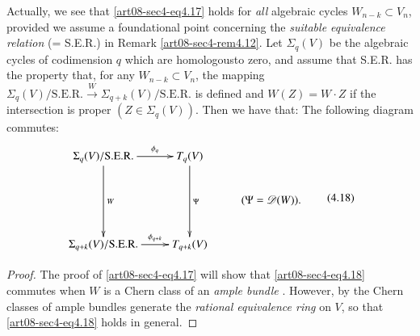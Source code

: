 \begin{remark*}
Actually, we see that \eqref{art08-sec4-eq4.17} holds for {\em all} algebraic cycles $W_{n-k}\subset V_{n}$, provided we assume a foundational point concerning the {\em suitable equivalence relation} (= S.E.R.) in Remark \ref{art08-sec4-rem4.12}. Let $\Sigma_{q}(V)$ be the algebraic cycles of codimension $q$ which are homologous\pageoriginale to zero, and assume that S.E.R. has the property that, for any $W_{n-k}\subset V_{n}$, the mapping $\Sigma_{q}(V)/\text{S.E.R.}\xrightarrow{W}\Sigma_{q+k}(V)/\text{S.E.R.}$ is defined and $W(Z)=W\cdot Z$ if the intersection is proper $(Z\in \Sigma_{q}(V))$. Then we have that: The following diagram commutes:
\begin{equation*}
\vcenter{\xymatrix{
\Sigma_{q}(V)/\text{S.E.R.}\ar[dd]^-{W}\ar[r]^-{\phi_{q}} & T_{q}(V)\ar[dd]^-{\Psi} &\\
 & & (\Psi=\mathscr{D}(W)).\\
\Sigma_{q+k}(V)/\text{S.E.R.}\ar[r]^-{\phi_{q+k}} & T_{q+k}(V) &
}}\tag{4.18}\label{art08-sec4-eq4.18}
\end{equation*}
\end{remark*}

\begin{proof}
The proof of \eqref{art08-sec4-eq4.17} will show that \eqref{art08-sec4-eq4.18} commutes when $W$ is a Chern class of an {\em ample bundle} \cite{art08-key11}. However, by \cite{art08-key12} the Chern classes of ample bundles generate the {\em rational equivalence ring} on $V$, so that \eqref{art08-sec4-eq4.18} holds in general.
\end{proof}

